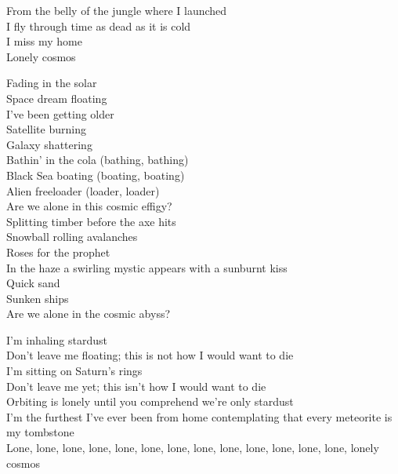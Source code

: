 


From the belly of the jungle where I launched\\
I fly through time as dead as it is cold\\
I miss my home\\
Lonely cosmos\\


Fading in the solar\\
Space dream floating\\
I've been getting older\\
Satellite burning\\
Galaxy shattering\\
Bathin' in the cola (bathing, bathing)\\
Black Sea boating (boating, boating)\\
Alien freeloader (loader, loader)\\
Are we alone in this cosmic effigy?\\

Splitting timber before the axe hits\\
Snowball rolling avalanches\\
Roses for the prophet\\
In the haze a swirling mystic appears with a sunburnt kiss\\
Quick sand\\
Sunken ships\\
Are we alone in the cosmic abyss?\\


I'm inhaling stardust\\
Don't leave me floating; this is not how I would want to die\\
I'm sitting on Saturn's rings\\
Don't leave me yet; this isn't how I would want to die\\
Orbiting is lonely until you comprehend we're only stardust\\
I'm the furthest I've ever been from home contemplating that every meteorite is my tombstone\\
Lone, lone, lone, lone, lone, lone, lone, lone, lone, lone, lone, lone, lone, lonely cosmos\\

